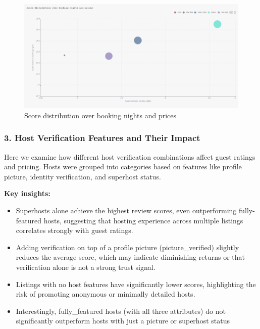 \vspace{1em}
\begin{figure}[H]
    \centering
    \includegraphics[width=1\textwidth]{images/q2_2.jpg}
    \caption{Score distribution over booking nights and prices}
    \label{fig:figureq4}
\end{figure}

\subsubsection*{3. Host Verification Features and Their Impact}

Here we examine how different host verification combinations affect guest ratings and pricing. Hosts were grouped into categories based on features like profile picture, identity verification, and superhost status.

\vspace{0.5em}
\textbf{Key insights:}
\begin{itemize}
    \item Superhosts alone achieve the highest review scores, even outperforming fully-featured hosts, suggesting that hosting experience across multiple listings correlates strongly with guest ratings.
    \item Adding verification on top of a profile picture (picture\_verified) slightly reduces the average score, which may indicate diminishing returns or that verification alone is not a strong trust signal.
    \item Listings with no host features have significantly lower scores, highlighting the risk of promoting anonymous or minimally detailed hosts.
    \item Interestingly, fully\_featured hosts (with all three attributes) do not significantly outperform hosts with just a picture or superhost status
\end{itemize}

